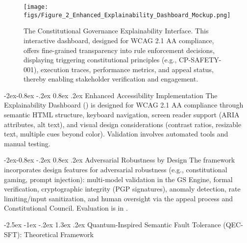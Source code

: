 \documentclass[manuscript,screen,9pt]{acmart}
\makeatletter
\renewcommand\section{\@startsection{section}{1}{\z@}%
  {-2.5ex \@plus -1ex \@minus -.2ex}%
  {1.3ex \@plus.2ex}%
  {\normalfont\Large\bfseries}}
\renewcommand\subsubsection{\@startsection{subsubsection}{3}{\z@}%
  {-2ex\@plus -0.8ex \@minus -.2ex}%
  {0.8ex \@plus .2ex}%
  {\normalfont\normalsize\bfseries}}
\makeatother
\begin{document}
\begin{figure}[!htb]
\centering
\texttt{[image: figs/Figure\_2\_Enhanced\_Explainability\_Dashboard\_Mockup.png]}
\caption[Constitutional Governance Explainability Interface]{The Constitutional Governance Explainability Interface. This interactive dashboard, designed for WCAG 2.1 AA compliance, offers fine-grained transparency into rule enforcement decisions, displaying triggering constitutional principles (e.g., CP-SAFETY-001), execution traces, performance metrics, and appeal status, thereby enabling stakeholder verification and engagement.}
\label{fig:explainability_dashboard}
\end{figure}

\subsubsection{Enhanced Accessibility Implementation}
\label{subsubsec:enhanced_accessibility}
The Explainability Dashboard () is designed for WCAG 2.1 AA compliance through semantic HTML structure, keyboard navigation, screen reader support (ARIA attributes, alt text), and visual design considerations (contrast ratios, resizable text, multiple cues beyond color). Validation involves automated tools and manual testing.

\subsubsection{Adversarial Robustness by Design}
\label{subsubsec:adversarial_robustness_methods}
The framework incorporates design features for adversarial robustness (e.g., constitutional gaming, prompt injection): multi-model validation in the GS Engine, formal verification, cryptographic integrity (PGP signatures), anomaly detection, rate limiting/input sanitization, and human oversight via the appeal process and Constitutional Council. Evaluation is in .

\section{Quantum-Inspired Semantic Fault Tolerance (QEC-SFT): Theoretical Framework}
\label{sec:qec_sft}
\end{document}
